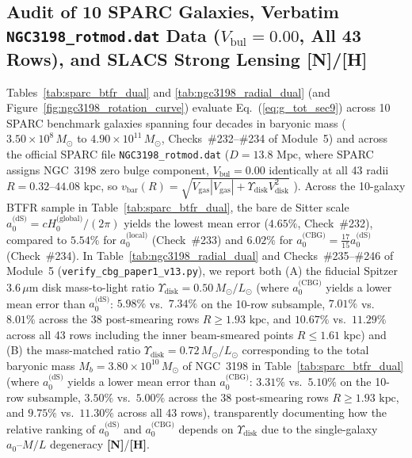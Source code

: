 \documentclass[11pt,a4paper]{article}
\newcommand{\catH}{\textbf{\textcolor{orange!85!black}{[H]}}}
\newcommand{\catN}{\textbf{\textcolor{teal!75!black}{[N]}}}
\theoremstyle{definition}
\theoremstyle{remark}
\begin{document}
\subsection{\texorpdfstring{Audit of 10 SPARC Galaxies, Verbatim \texttt{NGC3198\_rotmod.dat} Data ($V_{\text{bul}} = 0.00$, All 43 Rows), and SLACS Strong Lensing \catN/\catH}{Audit of 10 SPARC Galaxies, Verbatim NGC3198_rotmod.dat Data (V_bul = 0.00, All 43 Rows), and SLACS Strong Lensing}}

Tables~\ref{tab:sparc_btfr_dual} and \ref{tab:ngc3198_radial_dual} (and Figure~\ref{fig:ngc3198_rotation_curve}) evaluate Eq.~(\ref{eq:g_tot_sec9}) across 10 SPARC benchmark galaxies \cite{Lelli2016} spanning four decades in baryonic mass ($3.50 \times 10^8\,M_{\odot}$ to $4.90 \times 10^{11}\,M_{\odot}$, Checks~\#232--\#234 of Module~5) and across the official SPARC file \texttt{NGC3198\_rotmod.dat} ($D = 13.8\text{ Mpc}$, where SPARC assigns NGC~3198 zero bulge component, $V_{\text{bul}} = 0.00$ identically at all 43 radii $R = 0.32\text{--}44.08\text{ kpc}$, so $v_{\text{bar}}(R) = \sqrt{V_{\text{gas}}|V_{\text{gas}}| + \Upsilon_{\text{disk}}V_{\text{disk}}^2}$ \cite{Lelli2016}). Across the 10-galaxy BTFR sample in Table~\ref{tab:sparc_btfr_dual}, the bare de Sitter scale $a_0^{\text{(dS)}} = cH_0^{\text{(global)}}/(2\pi)$ yields the lowest mean error ($\mathbf{4.65\%}$, Check~\#232), compared to $5.54\%$ for $a_0^{\text{(local)}}$ (Check~\#233) and $6.02\%$ for $a_0^{\text{(CBG)}} = \frac{17}{15}a_0^{\text{(dS)}}$ (Check~\#234). In Table~\ref{tab:ngc3198_radial_dual} and Checks~\#235--\#246 of Module~5 (\texttt{verify\_cbg\_paper1\_v13.py}), we report both (A) the fiducial Spitzer $3.6\,\mu\text{m}$ disk mass-to-light ratio $\Upsilon_{\text{disk}} = 0.50\,M_{\odot}/L_{\odot}$ (where $a_0^{\text{(CBG)}}$ yields a lower mean error than $a_0^{\text{(dS)}}$: $\mathbf{5.98\%}$ vs.\ $\mathbf{7.34\%}$ on the 10-row subsample, $\mathbf{7.01\%}$ vs.\ $\mathbf{8.01\%}$ across the 38 post-smearing rows $R \ge 1.93\text{ kpc}$, and $10.67\%$ vs.\ $11.29\%$ across all 43 rows including the inner beam-smeared points $R \le 1.61\text{ kpc}$) and (B) the mass-matched ratio $\Upsilon_{\text{disk}} = 0.72\,M_{\odot}/L_{\odot}$ corresponding to the total baryonic mass $M_b = 3.80 \times 10^{10}\,M_{\odot}$ of NGC~3198 in Table~\ref{tab:sparc_btfr_dual} (where $a_0^{\text{(dS)}}$ yields a lower mean error than $a_0^{\text{(CBG)}}$: $\mathbf{3.31\%}$ vs.\ $\mathbf{5.10\%}$ on the 10-row subsample, $\mathbf{3.50\%}$ vs.\ $\mathbf{5.00\%}$ across the 38 post-smearing rows $R \ge 1.93\text{ kpc}$, and $9.75\%$ vs.\ $11.30\%$ across all 43 rows), transparently documenting how the relative ranking of $a_0^{\text{(dS)}}$ and $a_0^{\text{(CBG)}}$ depends on $\Upsilon_{\text{disk}}$ due to the single-galaxy $a_0\text{--}M/L$ degeneracy \catN/\catH.
\end{document}
